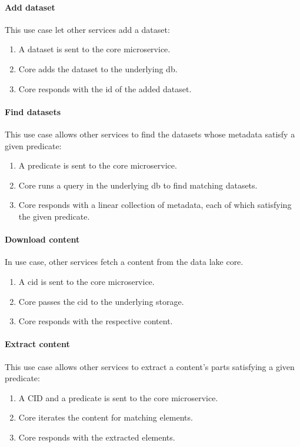 \paragraph{Add dataset}  This use case let other services add a dataset:
\begin{enumerate}
  \item A dataset is sent to the core microservice.
  \item Core adds the dataset to the underlying \gls{db}.
  \item Core responds with the \gls{id} of the added dataset.
\end{enumerate}

\paragraph{Find datasets}  This use case allows other services to find
the datasets whose metadata satisfy a given \gls{predicate}:
\begin{enumerate}
  \item A \gls{predicate} is sent to the core microservice.
  \item Core runs a query in the underlying \gls{db} to find matching datasets.
  \item Core responds with a linear collection of metadata,
    each of which satisfying the given \gls{predicate}.
\end{enumerate}

\paragraph{Download content}  In use case, other services fetch a \gls{content}
from the data lake core.
\begin{enumerate}
  \item A \gls{cid} is sent to the core microservice.
  \item Core passes the \gls{cid} to the underlying storage.
  \item Core responds with the respective \gls{content}.
\end{enumerate}

\paragraph{Extract content}  This use case allows other services
to extract a content's parts satisfying a given \gls{predicate}:
\begin{enumerate}
  \item A CID and a \gls{predicate} is sent to the core microservice.
  \item Core iterates the content for matching elements.
  \item Core responds with the extracted elements.
\end{enumerate}

